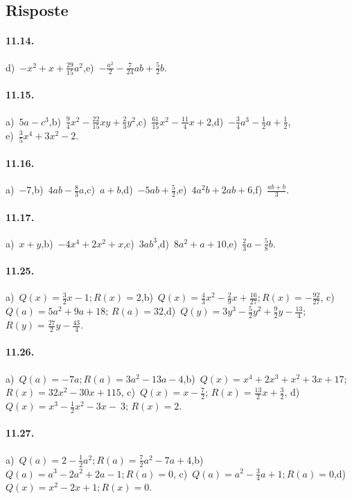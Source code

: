 \subsection{Risposte}
\paragraph{11.14.} d)~$-x^{2}+x+\frac{29}{15}a^{2}$,\quad e)~$-{\frac{a^{2}}{2}}-\frac{7}{24}ab+\frac{5}{2}b$.
\paragraph{11.15.} a)~$5a-c^{3}$,\quad b)~$\frac{9}{4}x^{2}-\frac{22}{15}xy+\frac{2}{3}y^{2}$,\quad c)~$\frac{61}{15}x^{2}-\frac{11}{4}x+2$,\quad d)~$-\frac{3}{4}a^{3}-\frac{1}{2}a+\frac{1}{2}$,\protect\\ e)~$\frac{3}{5}x^{4}+3x^{2}-2$.
\paragraph{11.16.} a)~$-7$,\quad b)~$4ab-\frac{8}{3}a$,\quad c)~$a+b$,\quad d)~$-5ab+\frac{5}{2}$,\quad e)~$4a^{2}b+2ab+6$,\quad f)~$\frac{ab+b}{3}$.
\paragraph{11.17.} a)~$x+y$,\quad b)~$-4x^{4}+2x^{2}+x$,\quad c)~$3ab^{3}$,\quad d)~$8a^{2}+a+10$,\quad e)~$\frac{2}{3}a-\frac{5}{8}b$.
\paragraph{11.25.}
a)~$Q(x)=\frac{3}{2}x-1; R(x)=2$,\quad b)~$Q(x)=\frac{4}{3}x^{2}-\frac{2}{9}x+\frac{16}{27}; R(x)=-{\frac{92}{27}}$,\quad
c)~{$Q(a)=5a^{2}+9a+18$}; $R(a)=32$,\quad d)~$Q(y)=3y^{3}-\frac{5}{2}y^{2}+\frac{9}{2}y-\frac{13}{4}$; $R(y)=\frac{27}{2}y-\frac{43}{4}$.
\paragraph{11.26.}
a)~$Q(a)=-7a; R(a)=3a^{2}-13a-4$,\quad b)~$Q(x)=x^{4}+2x^{3}+x^{2}+3x+17$;\protect\\ ${R(x)=32x^{2}-30x+115}$,\quad
c)~$Q(x)=x-\frac{7}{2}$; $R(x)=\frac{13}{2}x+\frac{3}{2}$, d)~$Q(x)=x^{3}-\frac{1}{2}x^{2}-3x-~3$; $R(x)=2$.
\paragraph{11.27.}
a)~$Q(a)=2-\frac{1}{2}a^{2}; R(a)=\frac{7}{2}a^{2}-7a+4$,\quad b)~$Q(a)=a^{3}-2a^{2}+2a-1; R(a)=0$,\quad
c)~$Q(a)=a^{2}-\frac{3}{4}a+1; R(a)=0$,\quad d)~$Q(x)=x^{2}-2x+1; R(x)=0$.
